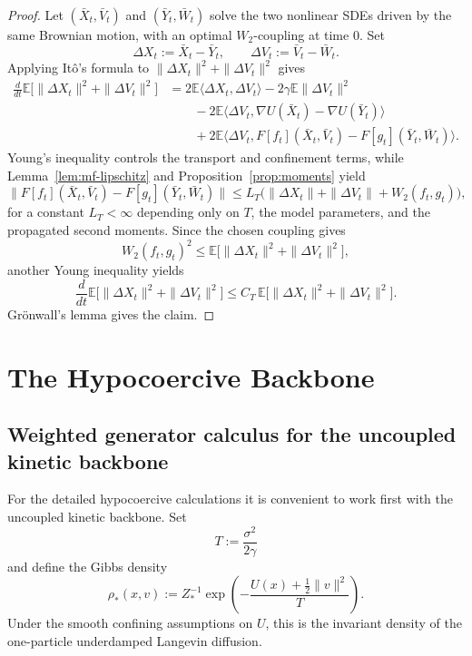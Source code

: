 \documentclass[11pt]{article}
\theoremstyle{definition}
\theoremstyle{remark}
\newcommand{\E}{\mathbb{E}}
\begin{document}
\begin{proof}
Let \((\bar X_t,\bar V_t)\) and \((\bar Y_t,\bar W_t)\) solve the two nonlinear
SDEs driven by the same Brownian motion, with an optimal \(W_2\)-coupling at
time \(0\). Set
\[
\Delta X_t:=\bar X_t-\bar Y_t,
\qquad
\Delta V_t:=\bar V_t-\bar W_t.
\]
Applying It\^o's formula to \(\|\Delta X_t\|^2+\|\Delta V_t\|^2\) gives
\begin{align*}
\frac{d}{dt}\E\bigl[\|\Delta X_t\|^2+\|\Delta V_t\|^2\bigr]
&=
2\E\langle \Delta X_t,\Delta V_t\rangle
-2\gamma \E\|\Delta V_t\|^2\\
&\qquad
-2\E\langle \Delta V_t,\nabla U(\bar X_t)-\nabla U(\bar Y_t)\rangle\\
&\qquad
+2\E\langle \Delta V_t,F[f_t](\bar X_t,\bar V_t)-F[g_t](\bar Y_t,\bar W_t)\rangle.
\end{align*}
Young's inequality controls the transport and confinement terms, while
Lemma~\ref{lem:mf-lipschitz} and Proposition~\ref{prop:moments} yield
\[
\|F[f_t](\bar X_t,\bar V_t)-F[g_t](\bar Y_t,\bar W_t)\|
\le
L_T\bigl(\|\Delta X_t\|+\|\Delta V_t\|+W_2(f_t,g_t)\bigr),
\]
for a constant \(L_T<\infty\) depending only on \(T\), the model parameters,
and the propagated second moments. Since the chosen coupling gives
\[
W_2(f_t,g_t)^2
\le
\E\bigl[\|\Delta X_t\|^2+\|\Delta V_t\|^2\bigr],
\]
another Young inequality yields
\[
\frac{d}{dt}\E\bigl[\|\Delta X_t\|^2+\|\Delta V_t\|^2\bigr]
\le
C_T\,\E\bigl[\|\Delta X_t\|^2+\|\Delta V_t\|^2\bigr].
\]
Gr\"onwall's lemma gives the claim.
\end{proof}

\section{The Hypocoercive Backbone}

\subsection{Weighted generator calculus for the uncoupled kinetic backbone}

For the detailed hypocoercive calculations it is convenient to work first with
the uncoupled kinetic backbone. Set
\[
T:=\frac{\sigma^2}{2\gamma}
\]
and define the Gibbs density
\begin{equation}\label{eq:gibbs}
\rho_*(x,v)
:=
Z_*^{-1}\exp\!\left(-\frac{U(x)+\frac12\|v\|^2}{T}\right).
\end{equation}
Under the smooth confining assumptions on $U$, this is the invariant density of
the one-particle underdamped Langevin diffusion.
\end{document}
